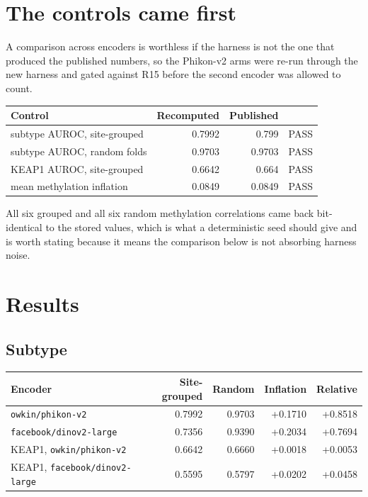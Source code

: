 \documentclass[11pt,a4paper]{article}
\begin{document}
\section{The controls came first}

A comparison across encoders is worthless if the harness is not the one that produced the
published numbers, so the Phikon-v2 arms were re-run through the new harness and gated against
R15 before the second encoder was allowed to count.

\begin{center}
\begin{tabular}{@{}lrrl@{}}
\toprule
\textbf{Control} & \textbf{Recomputed} & \textbf{Published} & \\
\midrule
subtype AUROC, site-grouped & 0.7992 & 0.799 & PASS \\
subtype AUROC, random folds & 0.9703 & 0.9703 & PASS \\
KEAP1 AUROC, site-grouped & 0.6642 & 0.664 & PASS \\
mean methylation inflation & 0.0849 & 0.0849 & PASS \\
\bottomrule
\end{tabular}
\end{center}

All six grouped and all six random methylation correlations came back bit-identical to the stored
values, which is what a deterministic seed should give and is worth stating because it means the
comparison below is not absorbing harness noise.

\section{Results}

\subsection{Subtype}

\begin{center}
\begin{tabular}{@{}lrrrr@{}}
\toprule
\textbf{Encoder} & \textbf{Site-grouped} & \textbf{Random} & \textbf{Inflation} &
\textbf{Relative} \\
\midrule
\texttt{owkin/phikon-v2} & 0.7992 & 0.9703 &
+0.1710 & +0.8518 \\
\texttt{facebook/dinov2-large} & 0.7356 & 0.9390 &
+0.2034 & +0.7694 \\
\midrule
KEAP1, \texttt{owkin/phikon-v2} & 0.6642 & 0.6660 &
+0.0018 & +0.0053 \\
KEAP1, \texttt{facebook/dinov2-large} & 0.5595 & 0.5797 &
+0.0202 & +0.0458 \\
\bottomrule
\end{tabular}
\end{center}
\end{document}
